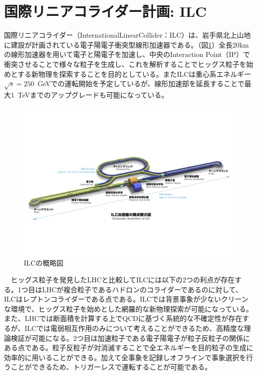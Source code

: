\section{国際リニアコライダー計画: ILC}
国際リニアコライダー（InternationalLinearCollider：ILC）は、岩手県北上山地に建設が計画されている電子陽電子衝突型線形加速器である。（図\ref{ilc}）全長20kmの線形加速器を用いて電子と陽電子を加速し、中央のInteraction Point（IP）で衝突させることで様々な粒子を生成し、これを解析することでヒッグス粒子を始めとする新物理を探索することを目的としている。またILCは重心系エネルギー$\sqrt{s} = 250$\ GeVでの運転開始を予定しているが、線形加速部を延長することで最大1\ TeVまでのアップグレードも可能になっている。\\
\begin{figure}[t]
	\begin{center}
 \includegraphics[keepaspectratio, scale=0.3]
 	{Figure/Introduction/ilc.jpg}
 		\caption{ILCの概略図}
 		\label{ilc}
	\end{center}
\end{figure}
　ヒッグス粒子を発見したLHCと比較してILCには以下の2つの利点が存在する。1つ目はLHCが複合粒子であるハドロンのコライダーであるのに対して、ILCはレプトンコライダーである点である。ILCでは背景事象が少ないクリーンな環境で、ヒッグス粒子を始めとした網羅的な新物理探索が可能になっている。また、LHCでは断面積を計算する上でQCDに基づく系統的な不確定性が存在するが、ILCでは電弱相互作用のみについて考えることができるため、高精度な理論検証が可能になる。2つ目は加速粒子である電子陽電子が粒子反粒子の関係にある点である。粒子反粒子が対消滅することで全エネルギーを目的粒子の生成に効率的に用いることができる。加えて全事象を記録しオフラインで事象選択を行うことができるため、トリガーレスで運転することが可能である。
